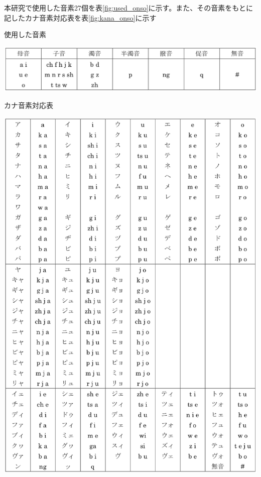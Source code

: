 \vspace{0.2in}\par
本研究で使用した音素27個を表\ref{fig:used_onso}に示す。また、その音素をもとに記したカナ音素対応表を表\ref{fig:kana_onso}に示す

\begin{table}[H]
  \begin{center}
    \caption{使用した音素 \label{fig:used_onso}}
    \includegraphics[scale=0.7]{./figure/used_onso.eps}
  \end{center}
  
\end{table}

\begin{table}[H]
  \begin{center}
    \caption{カナ音素対応表 \label{fig:kana_onso}}
    \includegraphics[scale=0.7]{./figure/kana_onso.eps}
  \end{center}
  
\end{table}

